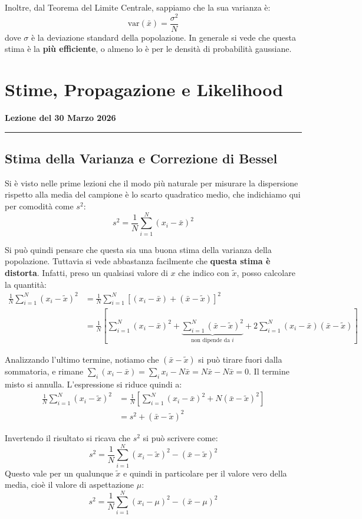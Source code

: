\documentclass[openany,a4paper,12pt]{book}
\theoremstyle{remark}
\newcommand{\thelezione}{}
\newcommand{\lezione}[2]{
\newpage
\renewcommand{\thelezione}{#2} 
\section{#1} 
\noindent\textbf{\color{RoyalBlue}Lezione del #2}\par\vspace{0.5em}\hrule\vspace{1em}
}
\begin{document}
Inoltre, dal Teorema del Limite Centrale, sappiamo che la sua varianza è:
\begin{equation*}
\text{var}(\bar{x}) = \frac{\sigma^2}{N}
\end{equation*}
dove $\sigma$ è la deviazione standard della popolazione.
In generale si vede che questa stima è la \textbf{più efficiente}, o almeno lo è per le densità di probabilità gaussiane.


\lezione{Stime, Propagazione e Likelihood}{30 Marzo 2026}

\subsection*{Stima della Varianza e Correzione di Bessel}

Si è visto nelle prime lezioni che il modo più naturale per misurare la dispersione rispetto alla media del campione è lo scarto quadratico medio, che indichiamo qui per comodità come $s^2$:
\begin{equation}
s^2 = \frac{1}{N} \sum_{i=1}^N (x_i - \bar{x})^2
\end{equation}

Si può quindi pensare che questa sia una buona stima della varianza della popolazione. Tuttavia si vede abbastanza facilmente che \textbf{questa stima è distorta}. Infatti, preso un qualsiasi valore di $x$ che indico con $\tilde{x}$, posso calcolare la quantità:
\begin{align*}
\frac{1}{N} \sum_{i=1}^N (x_i - \tilde{x})^2 &= \frac{1}{N} \sum_{i=1}^N \left[ (x_i - \bar{x}) + (\bar{x} - \tilde{x}) \right]^2 \\
&= \frac{1}{N} \left[ \sum_{i=1}^N (x_i - \bar{x})^2 + \underbrace{\sum_{i=1}^N (\bar{x} - \tilde{x})^2}_{\text{non dipende da } i} + 2 \sum_{i=1}^N (x_i - \bar{x})(\bar{x} - \tilde{x}) \right]
\end{align*}

Analizzando l'ultimo termine, notiamo che $(\bar{x} - \tilde{x})$ si può tirare fuori dalla sommatoria, e rimane $\sum_{i} (x_i - \bar{x}) = \sum_{i} x_i - N\bar{x} = N\bar{x} - N\bar{x} = 0$. Il termine misto si annulla. L'espressione si riduce quindi a:
\begin{align*}
\frac{1}{N} \sum_{i=1}^N (x_i - \tilde{x})^2 &= \frac{1}{N} \left[ \sum_{i=1}^N (x_i - \bar{x})^2 + N(\bar{x} - \tilde{x})^2 \right] \\
&= s^2 + (\bar{x} - \tilde{x})^2
\end{align*}

Invertendo il risultato si ricava che $s^2$ si può scrivere come:
\begin{equation}
s^2 = \frac{1}{N} \sum_{i=1}^N (x_i - \tilde{x})^2 - (\bar{x} - \tilde{x})^2
\end{equation}
Questo vale per un qualunque $\tilde{x}$ e quindi in particolare per il valore vero della media, cioè il valore di aspettazione $\mu$:
\begin{equation}
s^2 = \frac{1}{N} \sum_{i=1}^N (x_i - \mu)^2 - (\bar{x} - \mu)^2
\end{equation}
\end{document}
